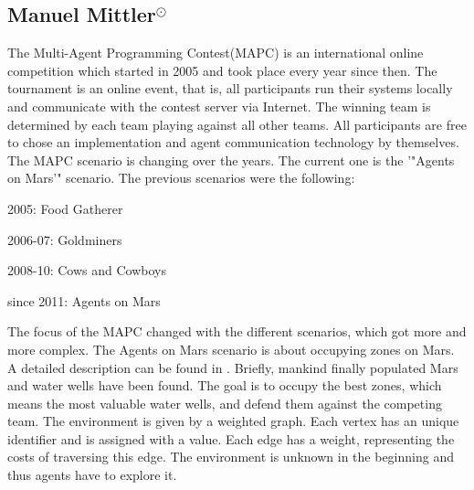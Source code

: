 \subsection[Multi Agent Programming Contest]{Manuel Mittler$^{\odot}$}
The Multi-Agent Programming Contest(MAPC) is an international online competition which started in 2005 and took place every year since then. The tournament is an online event, that is, all participants run their systems locally and communicate with the contest server via Internet. The winning team is determined by each team playing against all other teams. All participants are free to chose an implementation and agent communication technology by themselves. The MAPC scenario is changing over the years. The current one is the ’"Agents on Mars’" scenario. The previous scenarios were the following:
\begin{description}
	\item 2005: Food Gatherer
	\item 2006-07: Goldminers
	\item 2008-10: Cows and Cowboys
	\item since 2011: Agents on Mars
\end{description}
The focus of the MAPC changed with the different scenarios, which got more and more complex. The Agents on Mars scenario is about occupying zones on Mars. A detailed description can be found in \cite{MAPC}. Briefly, mankind finally populated Mars and water wells have been found. The goal is to occupy the best zones, which means the most valuable water wells, and defend them against the competing team. The environment is given by a weighted graph. Each vertex has an unique identiﬁer and is assigned with a value. Each edge has a weight, representing the costs of traversing this edge. The environment is unknown in the beginning and thus agents have to explore it.